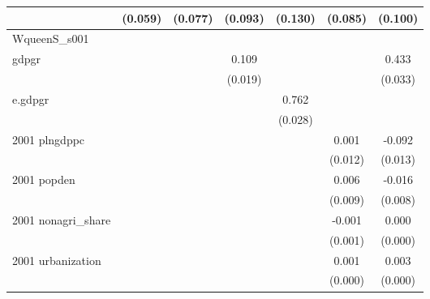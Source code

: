 \begin{table}[htbp]
\begin{tabular}{l*{6}{c}}
                    &     (0.059)         &     (0.077)         &     (0.093)         &     (0.130)         &     (0.085)         &     (0.100)         \\
\hline
WqueenS\_s001        &                     &                     &                     &                     &                     &                     \\
gdpgr               &                     &                     &       0.109\sym{***}&                     &                     &       0.433\sym{***}\\
                    &                     &                     &     (0.019)         &                     &                     &     (0.033)         \\
e.gdpgr             &                     &                     &                     &       0.762\sym{***}&                     &                     \\
                    &                     &                     &                     &     (0.028)         &                     &                     \\
2001 plngdppc       &                     &                     &                     &                     &       0.001         &      -0.092\sym{***}\\
                    &                     &                     &                     &                     &     (0.012)         &     (0.013)         \\
2001 popden         &                     &                     &                     &                     &       0.006         &      -0.016\sym{**} \\
                    &                     &                     &                     &                     &     (0.009)         &     (0.008)         \\
2001 nonagri\_share  &                     &                     &                     &                     &      -0.001\sym{*}  &       0.000         \\
                    &                     &                     &                     &                     &     (0.001)         &     (0.000)         \\
2001 urbanization   &                     &                     &                     &                     &       0.001\sym{***}&       0.003\sym{***}\\
                    &                     &                     &                     &                     &     (0.000)         &     (0.000)         \\

\end{tabular}
\end{table}

